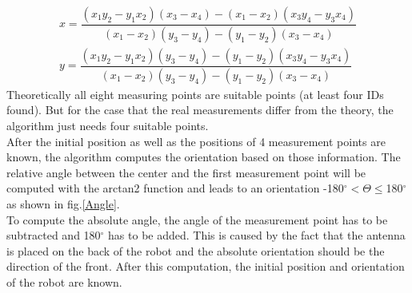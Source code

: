 \begin{align}
x = \dfrac{(x_1y_2-y_1x_2)(x_3-x_4)-(x_1-x_2)(x_3y_4-y_3x_4)}{(x_1-x_2)(y_3-y_4)-(y_1-y_2)(x_3-x_4)} \\
y = \dfrac{(x_1y_2-y_1x_2)(y_3-y_4)-(y_1-y_2)(x_3y_4-y_3x_4)}{(x_1-x_2)(y_3-y_4)-(y_1-y_2)(x_3-x_4)}
\end{align}
Theoretically all eight measuring points are suitable points (at least four IDs found). But for the case that the real measurements differ from the theory, the algorithm just needs four suitable points. \\
After the initial position as well as the positions of 4 measurement points are known, the algorithm computes the orientation based on those information. The relative angle between the center and the first measurement point will be computed with the arctan2 function and leads to an orientation -180$^\circ < \Theta \leq$180$^\circ$ as shown in fig.\ref{Angle}. \\
To compute the absolute angle, the angle of the measurement point has to be subtracted and 180$^\circ$ has to be added. This is caused by the fact that the antenna is placed on the back of the robot and the absolute orientation should be the direction of the front. After this computation, the initial position and orientation of the robot are known. \\

